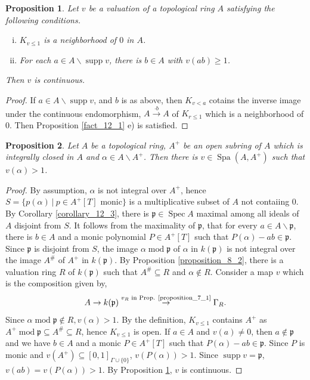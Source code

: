 \documentclass[8pt]{article}
\numberwithin{equation}{section}
\newtheorem{proposition}{Proposition}[subsection]
\DeclareMathOperator{\tmod}{mod}
\DeclareMathOperator{\supp}{supp}
\DeclareMathOperator{\Spec}{Spec}
\DeclareMathOperator{\Spa}{Spa}
\newcommand{\sep}[0]{\:|\:}
\newcommand{\p}[0]{\mathfrak{p}}
\begin{document}
\begin{proposition}
    \label{fact_12_4}
    Let $v$ be a valuation of a topological ring $A$ satisfying the following conditions.
    \begin{enumerate}[i.]
    \item $K_{v\leq 1}$ is a neighborhood of $0$ in $A$.
    \item For each $a\in A\backslash\supp v$, there is $b\in A$ with $v(ab)\geq1$.
    \end{enumerate}
    Then $v$ is continuous.
\end{proposition}
\begin{proof} 
    If $a\in A\backslash\supp v$, and $b$ is as above, then $K_{v<a}$ cotains the inverse image under the continuous endomorphism, $A\stackrel{\cdot b}{\to} A$ of $K_{r\leq 1}$ which is a neighborhood of $0$. Then Proposition \ref{fact_12_1} e) is satisfied.
\end{proof}
\begin{proposition}
    \label{proposition_12_2}
    Let $A$ be a topological ring, $A^+$ be an open subring of $A$ which is integrally closed in $A$ and $\alpha\in A\backslash A^+$. Then there is $v\in\Spa(A,A^+)$ such that $v(\alpha)>1$.
\end{proposition}
\begin{proof}%
    By assumption, $\alpha$ is not integral over $A^+$, hence $S=\{p(\alpha)\sep p\in A^+[T]\text{ monic}\}$ is a multiplicative subset of $A$ not contaiing $0$. By Corollary \ref{corollary_12_3}, there is $\p\in\Spec A$ maximal among all ideals of $A$ disjoint from $S$. It follows from the maximality of $\p$, that for every $a\in A\backslash\p$, there is $b\in A$ and a monic polynomial $P\in A^+[T]$ such that $P(\alpha) -ab\in\p$. Since $\p$ is disjoint from $S$, the image $\alpha\tmod\p$ of $\alpha$ in $k(\p)$ is not integral over the image $A^\#$ of $A^+$ in $k(\p)$. By Proposition \ref{proposition_8_2}, there is a valuation ring $R$ of $k(\p)$ such that $A^\#\subseteq R$ and $\alpha\not\in R$. Consider a map $v$ which is the composition given by,
    \begin{equation*}
        A\to k(\p)\stackrel{\text{$v_R$ in Prop. \ref{proposition_7_1}}}{\to}\Gamma_R.
    \end{equation*}
    Since $\alpha\tmod\p\not\in R, v(\alpha)>1$. By the definition, $K_{v\leq1}$ contains $A^+$ as $A^+\tmod\p\subseteq A^\#\subseteq R$, hence $K_{v\leq1}$ is open. If $a\in A$ and $v(a)\not=0$, then $a\not\in \p$ and we have $b\in A$ and a monic $P\in A^+[T]$ such that $P(\alpha)-ab\in\p$. Since $P$ is monic and $v(A^+)\subseteq[0,1]_{\Gamma\cup\{0\}}$, $v(P(\alpha))>1$. Since $\supp v=\p$, $v(ab)=v(P(\alpha))>1$. By Proposition \ref{fact_12_4}, $v$ is continuous. 
\end{proof}
\end{document}
